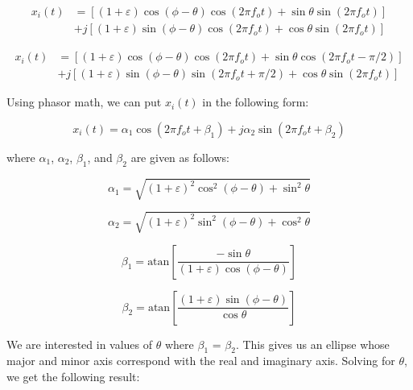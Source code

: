 \documentclass{article}
\begin{document}
\begin{equation}
\begin{split}
	x_i(t) &= \left[(1+\varepsilon)\cos(\phi-\theta)\cos(2{\pi}f_ot)+\sin\theta\sin(2{\pi}f_ot)\right]\\
	&+j\left[(1+\varepsilon)\sin(\phi-\theta)\cos(2{\pi}f_ot)+\cos\theta\sin(2{\pi}f_ot)\right]
\end{split}
\end{equation}

\begin{equation}
\begin{split}
	x_i(t) &= \left[(1+\varepsilon)\cos(\phi-\theta)\cos(2{\pi}f_ot)+\sin\theta\cos(2{\pi}f_ot-\pi/2)\right]\\
	&+j\left[(1+\varepsilon)\sin(\phi-\theta)\sin(2{\pi}f_ot+\pi/2)+\cos\theta\sin(2{\pi}f_ot)\right]
\end{split}
\end{equation}

Using phasor math, we can put $x_i(t)$ in the following form:

\begin{equation}
	x_i(t) = \alpha_1\cos(2{\pi}f_ot+\beta_1)+j\alpha_2\sin(2{\pi}f_ot+\beta_2)
\end{equation}

where $\alpha_1$, $\alpha_2$, $\beta_1$, and $\beta_2$ are given as follows:

\begin{equation}
	\alpha_1 = \sqrt{(1+\varepsilon)^2\cos^2(\phi-\theta)+\sin^2\theta}
\end{equation}

\begin{equation}
	\alpha_2 = \sqrt{(1+\varepsilon)^2\sin^2(\phi-\theta)+\cos^2\theta}
\end{equation}

\begin{equation}
	\beta_1 = \text{atan}\left[\frac{-\sin\theta}{(1+\varepsilon)\cos(\phi-\theta)}\right]
\end{equation}

\begin{equation}
	\beta_2 = \text{atan}\left[\frac{(1+\varepsilon)\sin(\phi-\theta)}{\cos\theta}\right]
\end{equation}

We are interested in values of $\theta$ where $\beta_1$ = $\beta_2$. This gives us an ellipse whose major and minor axis correspond with the real and imaginary axis. Solving for $\theta$, we get the following result:
\end{document}
